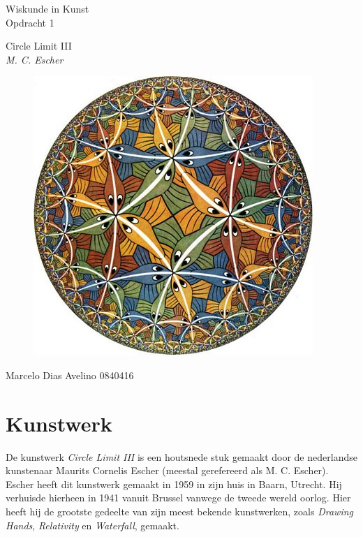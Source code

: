 \documentclass{article}
\begin{document}
\begin{center}
	\huge{Wiskunde in Kunst}\\
	\LARGE{Opdracht 1} \\
	
	\vspace{2cm}
	
	\Large{Circle Limit III}\\
	\large{\textit{M. C. Escher}}
	
	\begin{figure}[htp]
		\centering
		\includegraphics[scale=1.00]{Escher_Circle_Limit_III.jpg}
		\label{}
	\end{figure}
	
	\vfill
	\Large{Marcelo Dias Avelino} \hfill \large{0840416}
\end{center}

\pagebreak

\section{Kunstwerk}

De kunstwerk \textit{Circle Limit III} is een houtsnede stuk gemaakt door de nederlandse kunstenaar Maurits Cornelis Escher (meestal gerefereerd als M. C. Escher). Escher heeft dit kunstwerk gemaakt in 1959 in zijn huis in Baarn, Utrecht. Hij verhuisde hierheen in 1941 vanuit Brussel vanwege de tweede wereld oorlog. Hier heeft hij de grootste gedeelte van zijn meest bekende kunstwerken, zoals \textit{Drawing Hands}, \textit{Relativity} en \textit{Waterfall}, gemaakt.
\end{document}
